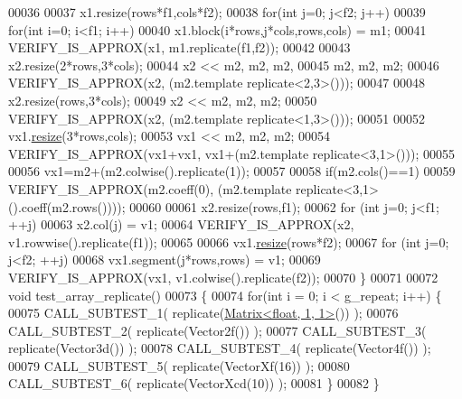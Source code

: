 \begin{DoxyCode}
00036 
00037   x1.resize(rows*f1,cols*f2);
00038   \textcolor{keywordflow}{for}(\textcolor{keywordtype}{int} j=0; j<f2; j++)
00039   \textcolor{keywordflow}{for}(\textcolor{keywordtype}{int} i=0; i<f1; i++)
00040     x1.block(i*rows,j*cols,rows,cols) = m1;
00041   VERIFY\_IS\_APPROX(x1, m1.replicate(f1,f2));
00042 
00043   x2.resize(2*rows,3*cols);
00044   x2 << m2, m2, m2,
00045         m2, m2, m2;
00046   VERIFY\_IS\_APPROX(x2, (m2.template replicate<2,3>()));
00047   
00048   x2.resize(rows,3*cols);
00049   x2 << m2, m2, m2;
00050   VERIFY\_IS\_APPROX(x2, (m2.template replicate<1,3>()));
00051   
00052   vx1.\hyperlink{class_eigen_1_1_plain_object_base_a99d9054ee2d5a40c6e00ded0265e9cea}{resize}(3*rows,cols);
00053   vx1 << m2, m2, m2;
00054   VERIFY\_IS\_APPROX(vx1+vx1, vx1+(m2.template replicate<3,1>()));
00055   
00056   vx1=m2+(m2.colwise().replicate(1));
00057   
00058   \textcolor{keywordflow}{if}(m2.cols()==1)
00059     VERIFY\_IS\_APPROX(m2.coeff(0), (m2.template replicate<3,1>().coeff(m2.rows())));
00060 
00061   x2.resize(rows,f1);
00062   \textcolor{keywordflow}{for} (\textcolor{keywordtype}{int} j=0; j<f1; ++j)
00063     x2.col(j) = v1;
00064   VERIFY\_IS\_APPROX(x2, v1.rowwise().replicate(f1));
00065 
00066   vx1.\hyperlink{class_eigen_1_1_plain_object_base_a99d9054ee2d5a40c6e00ded0265e9cea}{resize}(rows*f2);
00067   \textcolor{keywordflow}{for} (\textcolor{keywordtype}{int} j=0; j<f2; ++j)
00068     vx1.segment(j*rows,rows) = v1;
00069   VERIFY\_IS\_APPROX(vx1, v1.colwise().replicate(f2));
00070 \}
00071 
00072 \textcolor{keywordtype}{void} test\_array\_replicate()
00073 \{
00074   \textcolor{keywordflow}{for}(\textcolor{keywordtype}{int} i = 0; i < g\_repeat; i++) \{
00075     CALL\_SUBTEST\_1( replicate(\hyperlink{group___core___module_class_eigen_1_1_matrix}{Matrix<float, 1, 1>}()) );
00076     CALL\_SUBTEST\_2( replicate(Vector2f()) );
00077     CALL\_SUBTEST\_3( replicate(Vector3d()) );
00078     CALL\_SUBTEST\_4( replicate(Vector4f()) );
00079     CALL\_SUBTEST\_5( replicate(VectorXf(16)) );
00080     CALL\_SUBTEST\_6( replicate(VectorXcd(10)) );
00081   \}
00082 \}
\end{DoxyCode}
